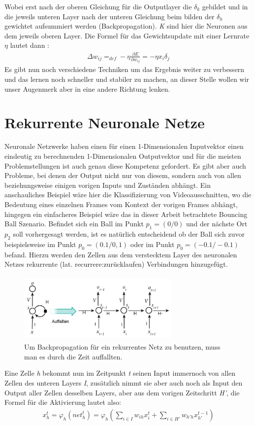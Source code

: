 Wobei erst nach der oberen Gleichung für die Outputlayer die \(\delta_{k}\) gebildet und in die jeweils unteren Layer nach der unteren Gleichung beim bilden der \(\delta_{h}\) gewichtet aufsummiert werden (Backpropagation). \textit{K} sind hier die Neuronen aus dem jeweils oberen Layer. Die Formel für das Gewichtsupdate mit einer Lernrate \(\eta\) lautet dann \cite{bib:mlp}:
\begin{gather}	
	\Delta w_{ij} =_{def}  -\eta \frac{\partial E}{\partial w_{ij}} = -\eta x_{i}\delta_{j}  
\end{gather} 
Es gibt nun noch verschiedene Techniken um das Ergebnis weiter zu verbessern und das lernen noch schneller und stabiler zu machen, an dieser Stelle wollen wir unser Augenmerk aber in eine andere Richtung lenken. 
\section{Rekurrente Neuronale Netze}

Neuronale Netzwerke haben einen für einen 1-Dimensionalen Inputvektor einen eindeutig zu berechnenden 1-Dimensionalen Outputvektor und für die meisten Problemstellungen ist auch genau diese Kompetenz gefordert. Es gibt aber auch Probleme, bei denen der Output nicht nur von diesem, sondern auch von allen beziehungsweise einigen vorigen Inputs und Zuständen abhängt. Ein anschauliches Beispiel wäre hier die Klassifizierung von Videoausschnitten, wo die Bedeutung eines einzelnen Frames vom Kontext der vorigen Frames abhängt, hingegen ein einfacheres Beispiel wäre das in dieser Arbeit betrachtete Bouncing Ball Szenario. Befindet sich ein Ball im Punkt \(p_{1}=(0/0)\) und der nächste Ort \(p_{2}\) soll vorhergesagt werden, ist es natürlich entscheidend ob der Ball sich zuvor beispielsweise im Punkt \(p_{0}=(0.1/0,1)\) oder im Punkt \(p_{0}=(-0.1/-0.1)\) befand. Hierzu werden den Zellen aus dem verstecktem Layer des neuronalen Netzes rekurrente (lat. recurrere:zurücklaufen) Verbindungen hinzugefügt.
\begin{figure}
	\centering
	\includegraphics[width=0.7\textwidth, height=130px]{pics/rnn.jpg}	
	\caption{Um Backpropagation für ein rekurrentes Netz zu benutzen, muss man es durch die Zeit auffallten. \cite{bib:rnn}}
	\label{img:rnn}
\end{figure}
Eine Zelle \textit{h} bekommt nun im Zeitpunkt \textit{t} seinen Input immernoch von allen Zellen des unteren Layers \textit{I}, zusätzlich nimmt sie aber auch noch als Input den Output aller Zellen desselben Layers, aber aus dem vorigen Zeitschritt \textit{H'}, die Formel für die Aktivierung lautet also: 
\begin{gather}
x^{t}_{h}=\varphi_{h}(net_{h}^{t})=\varphi_{h}(\sum_{i \in I}w_{ih}x^{t}_{i}+\sum_{i \in H'}w_{h'h}x^{t-1}_{h'})
\end{gather}


